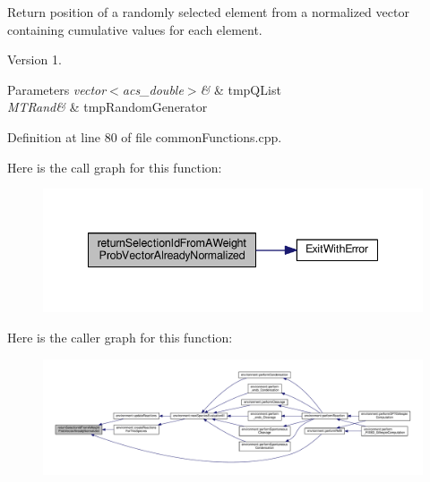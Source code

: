 Return position of a randomly selected element from a normalized vector containing cumulative values for each element. 

\begin{DoxyVersion}{Version}
1. 
\end{DoxyVersion}

\begin{DoxyParams}{Parameters}
{\em vector$<$acs\-\_\-double$>$\&} & tmp\-Q\-List \\
\hline
{\em M\-T\-Rand\&} & tmp\-Random\-Generator \\
\hline
\end{DoxyParams}


Definition at line 80 of file common\-Functions.\-cpp.



Here is the call graph for this function\-:\nopagebreak
\begin{figure}[H]
\begin{center}
\leavevmode
\includegraphics[width=338pt]{a00069_a4135ff15fd24eb8fbfee3d00e1cfbf20_cgraph}
\end{center}
\end{figure}




Here is the caller graph for this function\-:\nopagebreak
\begin{figure}[H]
\begin{center}
\leavevmode
\includegraphics[width=350pt]{a00069_a4135ff15fd24eb8fbfee3d00e1cfbf20_icgraph}
\end{center}
\end{figure}


